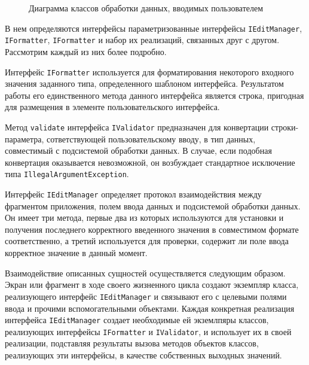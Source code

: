 \begin{figure}[h!]
  \centering
  \caption{Диаграмма классов обработки данных, вводимых пользователем}
  \label{fig:implementation_ui_edit_manager}
\end{figure}

В нем определяются интерфейсы параметризованные интерфейсы
\texttt{IEditManager}, \texttt{IFormatter}, \texttt{IFormatter}
и набор их реализаций, связанных друг с другом. Рассмотрим каждый из них более подробно.

Интерфейс \texttt{IFormatter} используется для форматирования некоторого входного
значения заданного типа, определенного шаблоном интерфейса.
Результатом работы его единственного метода данного интерфейса является строка,
пригодная для размещения в элементе пользовательского интерфейса.

Метод \texttt{validate} интерфейса \texttt{IValidator} предназначен для
конвертации строки-параметра, сответствующей пользовательскому вводу,
в тип данных, совместимый с подсистемой обработки данных. В случае,
если подобная конвертация оказывается невозможной, он возбуждает
стандартное исключение типа \texttt{IllegalArgumentException}.

Интерфейс \texttt{IEditManager} определяет протокол взаимодействия
между фрагментом приложения, полем ввода данных
и подсистемой обработки данных.
Он имеет три метода, первые два из которых используются
для установки и получения последнего корректного введенного значения
в совместимом формате соответственно, а третий используется для проверки,
содержит ли поле ввода корректное значение в данный момент.

Взаимодействие описанных сущностей осуществляется следующим образом.
Экран или фрагмент в ходе своего жизненного цикла создают экземпляр класса,
реализующего интерфейс \texttt{IEditManager} и связывают его с целевыми
полями ввода и прочими вспомогательными объектами.
Каждая конкретная реализация интерфейса \texttt{IEditManager}
создает необходимые ей экземлпяры классов,
реализующих интерфейсы \texttt{IFormatter}
и \texttt{IValidator}, и использует их в своей реализации,
подставляя результаты вызова методов объектов классов, реализующих
эти интерфейсы, в качестве собственных выходных значений.

